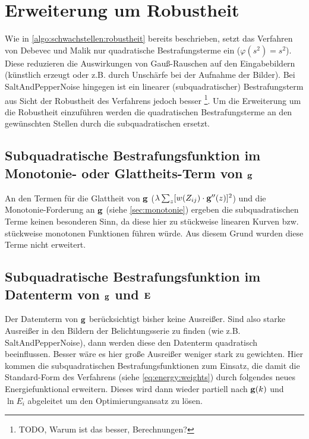 \section{Erweiterung um Robustheit}
\label{sec:robustheit}

Wie in \autoref{algo:schwachstellen:robustheit} bereits beschrieben, setzt das Verfahren von Debevec und Malik nur quadratische Bestrafungsterme ein ($\varphi(s^2) = s^2$). Diese reduzieren die Auswirkungen von Gauß-Rauschen auf den Eingabebildern (künstlich erzeugt oder z.B. durch Unschärfe bei der Aufnahme der Bilder). Bei \gls{SaltAndPepperNoise} 
hingegen ist ein linearer (subquadratischer) Bestrafungsterm aus Sicht der Robustheit des Verfahrens jedoch besser \footnote{TODO, Warum ist das besser, Berechnungen?}.
Um die Erweiterung um die Robustheit einzuführen werden die quadratischen Bestrafungsterme an den gewünschten Stellen durch die subquadratischen ersetzt. 


\subsection{Subquadratische Bestrafungsfunktion im Monotonie- oder Glattheits-Term von $\mathbf g$}
An den Termen für die Glattheit von $\mathbf g$ ($\lambda  \sum_z [w(Z_{ij}) \cdot \mathbf g''(z)]^2$) und die Monotonie-Forderung an $\mathbf g$ (siehe \autoref{sec:monotonie}) ergeben die subquadratischen Terme keinen besonderen Sinn, da diese hier zu stückweise linearen Kurven bzw. stückweise monotonen Funktionen führen würde. Aus diesem Grund wurden diese Terme nicht erweitert.


\subsection{Subquadratische Bestrafungsfunktion im Datenterm von $\mathbf g$ und $\mathbf E$}
Der Datemterm von $\mathbf g$ berücksichtigt bisher keine Ausreißer. Sind also starke Ausreißer in den Bildern der Belichtungsserie zu finden (wie z.B. \gls{SaltAndPepperNoise}), dann werden diese den Datenterm quadratisch beeinflussen. Besser wäre es hier große Ausreißer weniger stark zu gewichten.
Hier kommen die subquadratischen Bestrafungsfunktionen zum Einsatz, die damit die Standard-Form des Verfahrens (siehe \autoref{eq:energy:weights}) durch folgendes neues Energiefunktional erweitern. Dieses wird dann wieder partiell nach $\mathbf g(k)$ und $\ln E_i$ abgeleitet um den Optimierungsansatz zu lösen. 

